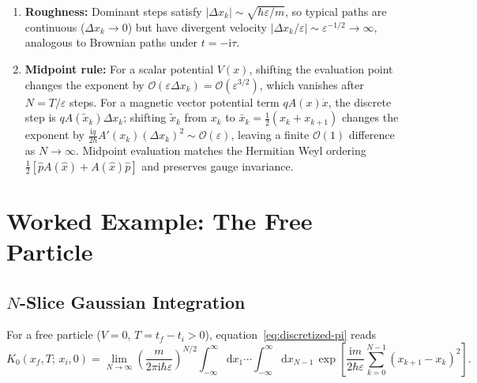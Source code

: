 \documentclass[11pt,a4paper]{article}
\newcommand{\ii}{\mathrm{i}}
\newcommand{\dd}{\mathrm{d}}
\newcommand{\order}{\mathcal{O}}
\begin{document}
\begin{remarkbox}
\begin{enumerate}[leftmargin=1.5em, itemsep=3pt]
    \item \textbf{Roughness:} Dominant steps satisfy $|\Delta x_k|\sim\sqrt{\hbar\varepsilon/m}$, so typical paths are continuous ($\Delta x_k\to 0$) but have divergent velocity $|\Delta x_k/\varepsilon|\sim\varepsilon^{-1/2}\to\infty$, analogous to Brownian paths under $t = -\ii\tau$.
    \item \textbf{Midpoint rule:} For a scalar potential $V(x)$, shifting the evaluation point changes the exponent by $\order(\varepsilon\Delta x_k) = \order(\varepsilon^{3/2})$, which vanishes after $N=T/\varepsilon$ steps. For a magnetic vector potential term $q A(x)\dot x$, the discrete step is $q A(\tilde x_k)\Delta x_k$; shifting $\tilde x_k$ from $x_k$ to $\bar x_k = \frac{1}{2}(x_k+x_{k+1})$ changes the exponent by $\frac{\ii q}{2\hbar}A'(x_k)(\Delta x_k)^2 \sim \order(\varepsilon)$, leaving a finite $\order(1)$ difference as $N\to\infty$. Midpoint evaluation matches the Hermitian Weyl ordering $\frac{1}{2}[\hat p A(\hat x)+A(\hat x)\hat p]$ and preserves gauge invariance.
\end{enumerate}
\end{remarkbox}

\section[Worked Example: The Free Particle]{Worked Example: The Free Particle}
\label{sec:free}

\subsection{\texorpdfstring{$N$}{N}-Slice Gaussian Integration}

For a free particle ($V=0$, $T=t_f-t_i>0$), equation~\eqref{eq:discretized-pi} reads
\begin{equation}
    K_0(x_f,T;\,x_i,0) = \lim_{N\to\infty} \left(\frac{m}{2\pi\ii\hbar\varepsilon}\right)^{N/2}
    \int_{-\infty}^{\infty}\dd x_1\cdots\int_{-\infty}^{\infty}\dd x_{N-1}\,
    \exp\!\left[\frac{\ii m}{2\hbar\varepsilon}\sum_{k=0}^{N-1}(x_{k+1}-x_k)^2\right].
    \label{eq:free-N-slice}
\end{equation}
\end{document}
